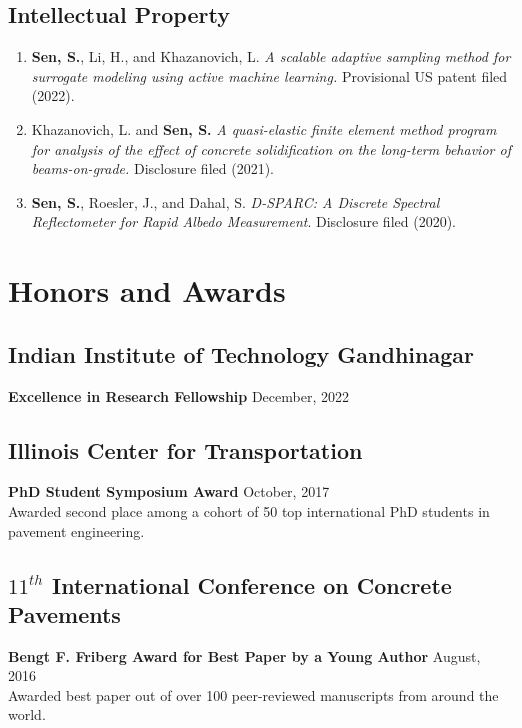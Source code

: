 \documentclass[12pt]{article}
\begin{document}
\hfill
\subsection*{Intellectual Property}
\begin{enumerate}
	\item \textbf{Sen, S.}, Li, H., and  Khazanovich, L. \textit{A scalable adaptive sampling method for surrogate modeling using active machine learning.} Provisional US patent filed (2022).
	\item Khazanovich, L. and \textbf{Sen, S.} \textit{A quasi-elastic finite element method program for analysis of the effect of concrete solidification on the long-term behavior of beams-on-grade.} Disclosure filed (2021).
	\item \textbf{Sen, S.}, Roesler, J., and Dahal, S. \textit{D-SPARC: A Discrete Spectral Reflectometer for Rapid Albedo Measurement}. Disclosure filed (2020). 
\end{enumerate} 

\bigskip
\section*{Honors and Awards}
\hfill
\subsection*{Indian Institute of Technology Gandhinagar}
\textbf{Excellence in Research Fellowship} \hfill December, 2022 \\

\subsection*{Illinois Center for Transportation}
\textbf{PhD Student Symposium Award} \hfill October, 2017 \\
Awarded second place among a cohort of 50 top international PhD students in pavement engineering. \\

\subsection*{$11^{th}$ International Conference on Concrete Pavements}
\textbf{Bengt F. Friberg Award for Best Paper by a Young Author} \hfill August, 2016  \\
Awarded best paper out of over 100 peer-reviewed manuscripts from around the world. \\
\end{document}
